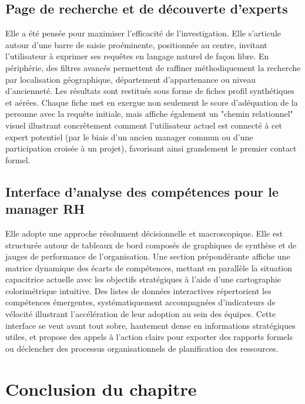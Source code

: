 \documentclass[12pt,a4paper]{article}
\begin{document}
\subsection{Page de recherche et de découverte d'experts}
Elle a été pensée pour maximiser l'efficacité de l'investigation. Elle s'articule autour d'une barre de saisie proéminente, positionnée au centre, invitant l'utilisateur à exprimer ses requêtes en langage naturel de façon libre. En périphérie, des filtres avancés permettent de raffiner méthodiquement la recherche par localisation géographique, département d'appartenance ou niveau d'ancienneté. Les résultats sont restitués sous forme de fiches profil synthétiques et aérées. Chaque fiche met en exergue non seulement le score d'adéquation de la personne avec la requête initiale, mais affiche également un "chemin relationnel" visuel illustrant concrètement comment l'utilisateur actuel est connecté à cet expert potentiel (par le biais d'un ancien manager commun ou d'une participation croisée à un projet), favorisant ainsi grandement le premier contact formel.

\subsection{Interface d'analyse des compétences pour le manager RH}
Elle adopte une approche résolument décisionnelle et macroscopique. Elle est structurée autour de tableaux de bord composés de graphiques de synthèse et de jauges de performance de l'organisation. Une section prépondérante affiche une matrice dynamique des écarts de compétences, mettant en parallèle la situation capacitrice actuelle avec les objectifs stratégiques à l'aide d'une cartographie colorimétrique intuitive. Des listes de données interactives répertorient les compétences émergentes, systématiquement accompagnées d'indicateurs de vélocité illustrant l'accélération de leur adoption au sein des équipes. Cette interface se veut avant tout sobre, hautement dense en informations stratégiques utiles, et propose des appels à l'action clairs pour exporter des rapports formels ou déclencher des processus organisationnels de planification des ressources.

\section{Conclusion du chapitre}
\end{document}
